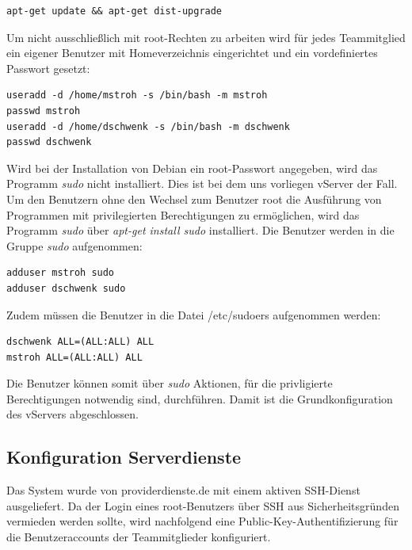 \begin{lstlisting}[style=customc]
apt-get update && apt-get dist-upgrade
\end{lstlisting}

Um nicht ausschließlich mit root-Rechten zu arbeiten wird für jedes Teammitglied ein eigener Benutzer mit Homeverzeichnis eingerichtet und ein vordefiniertes Passwort gesetzt:

\begin{lstlisting}[style=customc]
useradd -d /home/mstroh -s /bin/bash -m mstroh
passwd mstroh
useradd -d /home/dschwenk -s /bin/bash -m dschwenk
passwd dschwenk
\end{lstlisting}

Wird bei der Installation von Debian ein root-Passwort angegeben, wird das Programm \textit{sudo} nicht installiert. Dies ist bei dem uns vorliegen vServer der Fall. Um den Benutzern ohne den Wechsel zum Benutzer root die Ausführung von Programmen mit privilegierten Berechtigungen zu ermöglichen, wird das Programm \textit{sudo} über \textit{apt-get install sudo} installiert. Die Benutzer werden in die Gruppe \textit{sudo} aufgenommen:

\begin{lstlisting}[style=customc]
adduser mstroh sudo
adduser dschwenk sudo
\end{lstlisting}

Zudem müssen die Benutzer in die Datei /etc/sudoers aufgenommen werden:

\begin{lstlisting}[style=customc]
dschwenk ALL=(ALL:ALL) ALL
mstroh ALL=(ALL:ALL) ALL
\end{lstlisting}

Die Benutzer können somit über \textit{sudo} Aktionen, für die privligierte Berechtigungen notwendig sind, durchführen. Damit ist die Grundkonfiguration des vServers abgeschlossen. %


\subsection{Konfiguration Serverdienste}
\label{subsec:Konfiguration Serverdienste}

Das System wurde von providerdienste.de mit einem aktiven SSH-Dienst ausgeliefert. Da der Login eines root-Benutzers über SSH aus Sicherheitsgründen vermieden werden sollte, wird nachfolgend eine Public-Key-Authentifizierung für die Benutzeraccounts der Teammitglieder konfiguriert.\\

